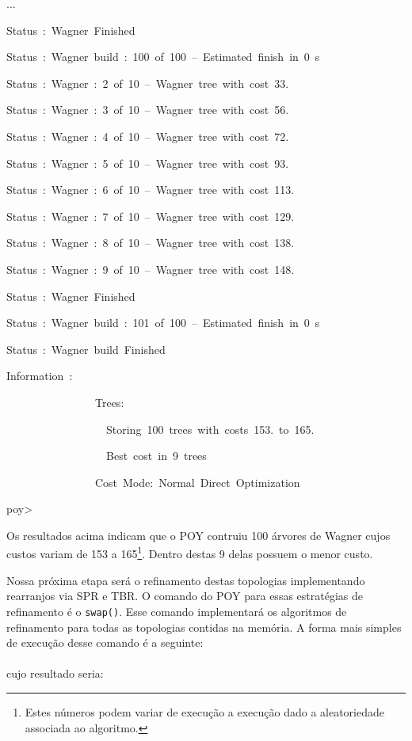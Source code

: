 \begin{refsection}
...

Status~:~Wagner~Finished

Status~:~Wagner~build~:~100~of~100~--~Estimated~finish~in~0~s

Status~:~Wagner~:~2~of~10~--~Wagner~tree~with~cost~33.

Status~:~Wagner~:~3~of~10~--~Wagner~tree~with~cost~56.

Status~:~Wagner~:~4~of~10~--~Wagner~tree~with~cost~72.

Status~:~Wagner~:~5~of~10~--~Wagner~tree~with~cost~93.

Status~:~Wagner~:~6~of~10~--~Wagner~tree~with~cost~113.

Status~:~Wagner~:~7~of~10~--~Wagner~tree~with~cost~129.

Status~:~Wagner~:~8~of~10~--~Wagner~tree~with~cost~138.

Status~:~Wagner~:~9~of~10~--~Wagner~tree~with~cost~148.

Status~:~Wagner~Finished

Status~:~Wagner~build~:~101~of~100~--~Estimated~finish~in~0~s

Status~:~Wagner~build~Finished

Information~:~

~~~~~~~~~~~~~~~~Trees:

~~~~~~~~~~~~~~~~~~Storing~100~trees~with~costs~153.~to~165.

~~~~~~~~~~~~~~~~~~Best~cost~in~9~trees~

~~~~~~~~~~~~~~~~Cost~Mode:~Normal~Direct~Optimization

poy>~

\normalsize


Os resultados acima indicam que o POY contruiu 100 árvores de Wagner cujos custos variam de 153 a 165\footnote{ Estes números podem variar de execução a execução dado a aleatoriedade associada ao algoritmo.}. Dentro destas 9 delas possuem o menor custo.

Nossa próxima etapa será o refinamento destas topologias implementando rearranjos via SPR e TBR. O comando do POY para essas estratégias de refinamento é o \texttt{swap()}. Esse comando implementará os algoritmos de refinamento para todas as topologias contidas na memória. A forma mais simples de execução desse comando é a seguinte:\\

\\

cujo resultado seria:\\


\end{refsection}
